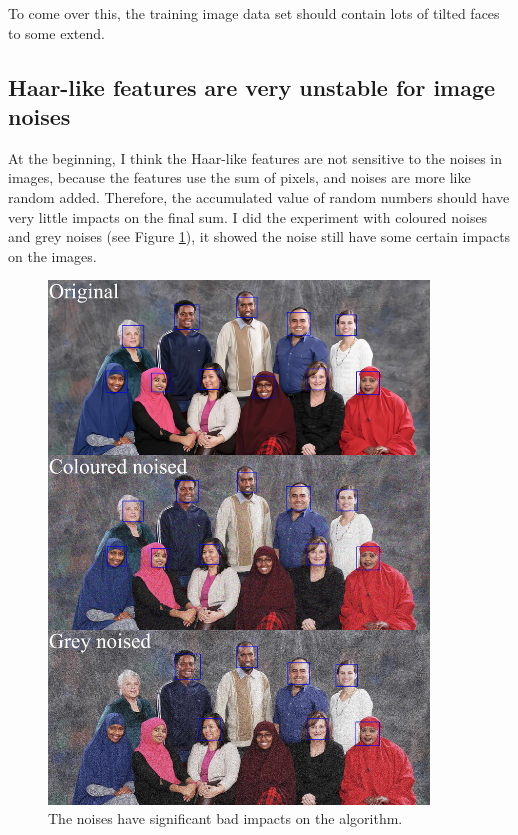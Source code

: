 \documentclass[10pt,twocolumn,letterpaper]{article}
\begin{document}
To come over this, the training image data set should contain lots of tilted faces to some extend.

\subsection{Haar-like features are very unstable for image noises}
At the beginning, I think the Haar-like features are not sensitive to the noises in images,
because the features use the sum of pixels, and noises are more like random added.
Therefore, the accumulated value of random numbers should have very little impacts on the final sum.
I did the experiment with coloured noises and grey noises (see Figure \ref{fig:noise}), it showed the noise still have some certain impacts on the images.

\begin{figure}
    \begin{center}
        \includegraphics[width=0.9\textwidth]{11people-noised}
    \end{center}
    \caption{The noises \cite{noise} have significant bad impacts \cite{skinface} on the algorithm.}
    \label{fig:noise}
\end{figure}
\end{document}
